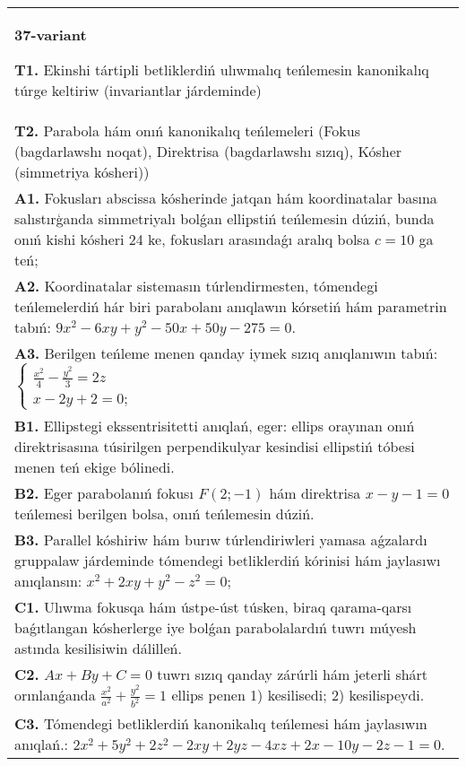 \documentclass{article}
\begin{document}
\begin{tabular}{m{17cm}}
\textbf{37-variant}
\newline

\textbf{T1.} Ekinshi tártipli betliklerdiń ulıwmalıq teńlemesin kanonikalıq túrge keltiriw (invariantlar járdeminde) \\
\textbf{T2.} Parabola hám onıń kanonikalıq teńlemeleri (Fokus (bagdarlawshı noqat), Direktrisa (bagdarlawshı sızıq), Kósher (simmetriya kósheri)) \\
\textbf{A1.} Fokusları abscissa kósherinde jatqan hám koordinatalar basına salıstırģanda simmetriyalı bolǵan ellipstiń teńlemesin dúziń, bunda onıń kishi kósheri 24 ke, fokusları arasındaǵı aralıq bolsa $c = 10$ ga teń; \\
\textbf{A2.} Koordinatalar sistemasın túrlendirmesten, tómendegi teńlemelerdiń hár biri parabolanı anıqlawın kórsetiń hám parametrin tabıń: $9 x^2-6 x y+y^2-50 x+50 y-275=0$. \\
\textbf{A3.} Berilgen teńleme menen qanday iymek sızıq anıqlanıwın tabıń: $\left\{\begin{array}{l}\frac{x^2}{4}-\frac{y^2}{3}=2 z \\ x-2 y+2=0 ;\end{array}\right.$ \\
\textbf{B1.} Ellipstegi ekssentrisitetti anıqlań, eger: ellips orayınan onıń direktrisasına túsirilgen perpendikulyar kesindisi ellipstiń tóbesi menen teń ekige bólinedi. \\
\textbf{B2.} Eger parabolanıń fokusı $F(2;-1) $ hám direktrisa $x-y-1=0$ teńlemesi berilgen bolsa, onıń teńlemesin dúziń. \\
\textbf{B3.} Parallel kóshiriw hám burıw túrlendiriwleri yamasa aǵzalardı gruppalaw járdeminde tómendegi betliklerdiń kórinisi hám jaylasıwı anıqlansın: $x^2+2 x y+y^2-z^2=0$; \\
\textbf{C1.} Ulıwma fokusqa hám ústpe-úst túsken, biraq qarama-qarsı baǵıtlangan kósherlerge iye bolǵan parabolalardıń tuwrı múyesh astında kesilisiwin dálilleń. \\
\textbf{C2.} $A x+B y+C=0$ tuwrı sızıq qanday zárúrli hám jeterli shárt orınlanǵanda $\frac{x^2}{a^2}+\frac{y^2}{b^2}=1$ ellips penen 1) kesilisedi; 2) kesilispeydi. \\
\textbf{C3.} Tómendegi betliklerdiń kanonikalıq teńlemesi hám jaylasıwın anıqlań.: $2 x^2+5 y^2+2 z^2-2 x y+2 y z-4 x z+2 x-10 y-2 z-1=0$. \\

\end{tabular}
\vspace{1cm}
\end{document}
